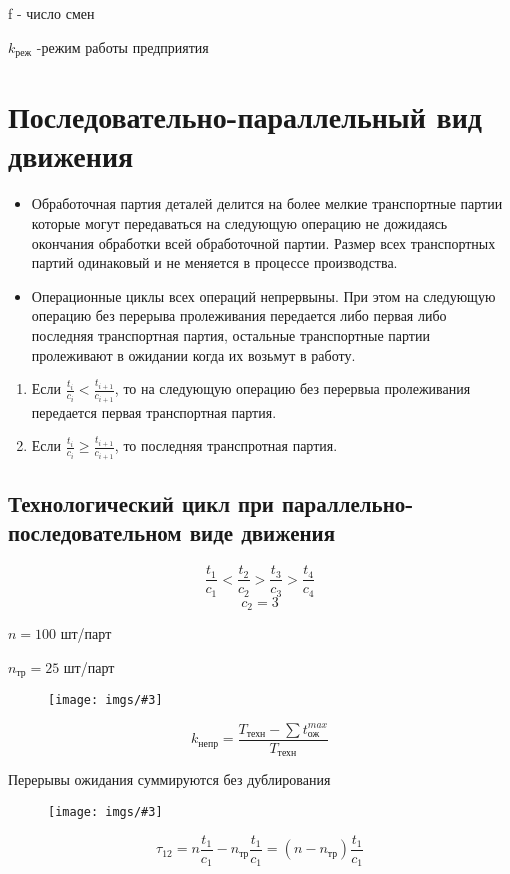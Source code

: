 \documentclass[14pt,a4paper,oneside]{extarticle}
\newcommand{\pic}[3]{
	\begin{figure}[#1]
		\begin{center}
			\texttt{[image: imgs/\#3]}
		\end{center}
	\end{figure}
}
\begin{document}
f - число смен

$k_\text{реж}$ -режим работы предприятия

\section{Последовательно-параллельный вид движения}


\begin{itemize}
    \item Обработочная партия деталей делится на более мелкие транспортные партии которые могут передаваться на следующую операцию не дожидаясь окончания обработки всей обработочной партии. Размер всех транспортных партий одинаковый и не меняется в процессе производства.
    \item Операционные циклы всех операций непрервыны. При этом на следующую операцию без перерыва пролеживания передается либо первая либо последняя транспортная партия, остальные транспортные партии пролеживают в ожидании когда их возьмут в работу.
\end{itemize}

\begin{enumerate}
    \item Если $\frac{t_i}{c_i}<\frac{t_{i+1}}{c_{i+1}}$, то на следующую операцию без перервыа пролеживания передается первая транспортная партия.
    \item Если $\frac{t_i}{c_i}\geq \frac{t_{i+1}}{c_{i+1}}$, то последняя транспротная партия.
\end{enumerate}

\subsection{Технологический цикл при параллельно-последовательном виде движения}

\[\frac{t_1}{c_1}<\frac{t_2}{c_2}>\frac{t_3}{c_3}>\frac{t_4}{c_4}\]
\[c_2=3\]

$n=100$ шт/парт

$n_{\text{тр}}=25$ шт/парт

\pic{H}{\textwidth}{4}

\[k_\text{непр}=\frac{T_\text{техн}-\sum t_\text{ож}^{max}}{T_\text{техн}}\]

Перерывы ожидания суммируются без дублирования

\pic{H}{\textwidth}{5}

\[\tau_{12}=n\frac{t_1}{c_1}-n_\text{тр}\frac{t_1}{c_1}=(n-n_\text{тр})\frac{t_1}{c_1}\]
\end{document}
